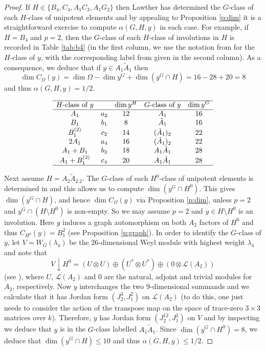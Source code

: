 \documentclass[twoside,a4paper,reqno,11pt]{amsart}
\renewcommand{\a}{\alpha}
\renewcommand{\l}{\lambda}
\renewcommand{\O}{\Omega}
\newcommand{\<}{\langle}
\renewcommand{\>}{\rangle}
\newcommand{\leqs}{\leqslant}
\renewcommand{\:}{\colon}
\theoremstyle{plain}
\theoremstyle{definition}
\begin{document}
\begin{proof}
If $H \in \{B_4,C_4,A_1C_3,A_1G_2\}$ then Lawther \cite{Law2} has determined the $G$-class of each $H$-class of unipotent elements and by appealing to Proposition \ref{p:dim} it is a straightforward exercise to compute $\a(G,H,y)$ in each case. For example, if $H = B_4$ and $p=2$, then the $G$-class of each $H$-class of involutions in $H$ is recorded in Table \ref{tab:b4} (in the first column, we use the notation from \cite[Table 4]{Law2} for the $H$-class of $y$, with the corresponding label from \cite{AS} given in the second column). As a consequence, we deduce that if $y \in A_1\tilde{A}_1$ then 
\[
\dim C_{\O}(y) = \dim \O - \dim y^G + \dim(y^G \cap H) = 16-28+20 = 8
\]
and thus $\a(G,H,y) = 1/2$.

{\small
\begin{table}
\[
\begin{array}{ccccc} \hline
\mbox{$H$-class of $y$} & & \dim y^H & \mbox{$G$-class of $y$} & \dim y^G \\ \hline
A_1 & a_2 & 12 & A_1 & 16 \\
B_1 & b_1 & 8 & \tilde{A}_1 & 16 \\
B_1^{(2)} & c_2 & 14 & (\tilde{A}_1)_2 & 22 \\
2A_1 & a_4 & 16 & (\tilde{A}_1)_2  & 22 \\
A_1+B_1 & b_3 & 18 & A_1\tilde{A}_1  & 28 \\
A_1+B_1^{(2)} & c_4 & 20 & A_1\tilde{A}_1 & 28 \\ \hline
\end{array}
\] 
\caption{The case $G = F_4$, $H = B_4$, $p=2$}
\label{tab:b4}
\end{table}}

Next assume $H = A_2\tilde{A}_2.2$. The $G$-class of each $H^0$-class of unipotent elements is determined in \cite[Section 4.7]{Law2} and this allows us to  compute $\dim(y^G \cap H^0)$. This gives $\dim(y^G \cap H)$, and hence $\dim C_{\O}(y)$ via Proposition \ref{p:dim}, unless $p=2$ and $y^G \cap (H \setminus H^0)$ is non-empty. So we may assume $p=2$ and $y \in H \setminus H^0$ is an involution. Here $y$ induces a graph automorphism on both $A_2$ factors of $H^0$ and thus $C_{H^0}(y) = B_1^2$ (see Proposition \ref{p:graph}). In order to identify the $G$-class of $y$, let $V = W_G(\l_4)$ be the $26$-dimensional Weyl module with highest weight $\l_4$ and note that 
\[
V\downarrow H^0 = (U \otimes U) \oplus (U^* \otimes U^*) \oplus (0 \otimes \mathcal{L}(A_2))
\]
(see \cite[Table 2]{Thomas}), where $U$, $\mathcal{L}(A_2)$ and $0$ are the natural, adjoint and trivial modules for $A_2$, respectively. Now $y$ interchanges the two $9$-dimensional summands and we calculate that it has Jordan form $(J_2^3,J_1^2)$ on $\mathcal{L}(A_2)$ (to do this, one just needs to consider the action of the transpose map on the space of trace-zero $3 \times 3$ matrices over $k$). Therefore, $y$ has Jordan form $(J_2^{12},J_1^2)$ on $V$ and by inspecting \cite[Table 3]{Law1} we deduce that $y$ is in the $G$-class labelled $A_1\tilde{A}_1$. Since $\dim(y^G \cap H^0) = 8$, we deduce that $\dim(y^G \cap H) \leqs 10$ and thus $\a(G,H,y) \leqs 1/2$.


\end{proof}
\end{document}
